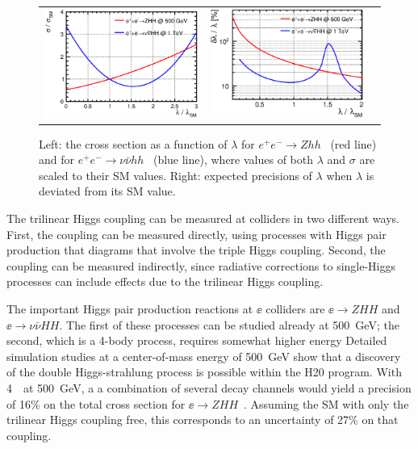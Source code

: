 \begin{figure}[htb]
  \centering
  \begin{tabular}[c]{ccc}
    \includegraphics[width=0.45\hsize]{chapters/figures/xsec_coupling_BSM.eps} &
    \includegraphics[width=0.45\hsize]{chapters/figures/precision_BSM_HHH.eps} \\   
 \end{tabular}
  \caption{Left: the cross section as a function of $\lambda$ for $e^+e^-\to Zhh$ ~(red line) and for 
  $e^+e^-\to\nu\bar{\nu}hh$ ~(blue line), where values of both $\lambda$ and $\sigma$ are scaled to their 
  SM values. Right: expected precisions of $\lambda$ when $\lambda$ is deviated from its SM value.}
  \label{fig:HHHBSM}
\end{figure}

The  trilinear Higgs coupling can be measured at colliders in two
different ways.   First, the coupling can be measured directly, using 
processes with Higgs pair production
that  diagrams that involve the triple Higgs coupling.  Second, the
coupling can be measured indirectly, since
radiative corrections to single-Higgs processes can include effects
due to the trilinear Higgs coupling.

The important Higgs pair production reactions at $\ee$ colliders are 
$\ee\to ZHH$ and $\ee\to \nu\bar\nu HH$.    The first of these
processes can be studied already at 500~GeV; the second, which is a
4-body process, requires
somewhat higher energy
Detailed simulation studies at a center-of-mass energy of 500~GeV show that a discovery of the
double Higgs-strahlung process is possible within the H20 program.
With 4~\iab\ at 500~GeV, a
a combination of several decay channels
would yield a precision of 16\% on the total cross section for
$\ee\to ZHH$~\cite{Duerig:2016dvi}.   Assuming the SM with only the
trilinear Higgs coupling free, this corresponds to an uncertainty of
27\% on that coupling.


